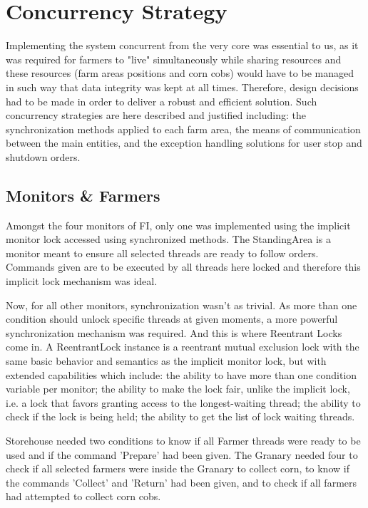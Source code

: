 \documentclass[12pt]{article}
\begin{document}
\newpage
\section{Concurrency Strategy} %

Implementing the system concurrent from the very core was essential to us, as it was required for farmers to "live" simultaneously while sharing resources and 
these resources (farm areas positions and corn cobs) would have to be managed in such way that data integrity was kept at all times.
Therefore, design decisions had to be made in order to deliver a robust and efficient solution.
Such concurrency strategies are here described and justified including: the synchronization methods applied to each farm area, the means of communication between
the main entities, and the exception handling solutions for user stop and shutdown orders.

\subsection{Monitors \& Farmers} \label{monitors} %

Amongst the four monitors of FI, only one was implemented using the implicit monitor lock accessed using synchronized methods.
The StandingArea is a monitor meant to ensure all selected threads are ready to follow orders.
Commands given are to be executed by all threads here locked and therefore this implicit lock mechanism was ideal.

Now, for all other monitors, synchronization wasn't as trivial.
As more than one condition should unlock specific threads at given moments, a more powerful synchronization mechanism was required.
And this is where Reentrant Locks come in.
A ReentrantLock \cite{reentrantlock} instance is a reentrant mutual exclusion lock with the same basic behavior and semantics as the implicit monitor lock, 
but with extended capabilities which include: the ability to have more than one condition variable per monitor; the ability to make the lock fair, unlike the 
implicit lock, i.e. a lock that favors granting access to the longest-waiting thread; the ability to check if the lock is being held; the ability to get the 
list of lock waiting threads.

Storehouse needed two conditions to know if all Farmer threads were ready to be used and if the command 'Prepare' had been given.
The Granary needed four to check if all selected farmers were inside the Granary to collect corn, to know if the commands 'Collect' and 'Return' had 
been given, and to check if all farmers had attempted to collect corn cobs.
\end{document}
